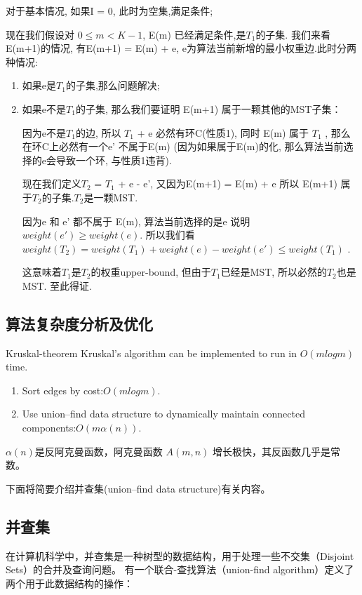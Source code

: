 对于基本情况, 如果I = 0, 此时为空集,满足条件;

现在我们假设对 $0 \leq m < K-1$, E(m) 已经满足条件,是$T_1$的子集. 我们来看 E(m+1)的情况,
有E(m+1) = E(m) + {e}, e为算法当前新增的最小权重边.此时分两种情况:

\begin{enumerate}
	\item 如果{e}是$T_1$的子集,那么问题解决;
	\item 如果{e}不是$T_1$的子集, 那么我们要证明 E(m+1) 属于一颗其他的MST子集：

	因为{e}不是$T_1$的边, 所以 $T_1$ + {e} 必然有环C(性质1), 同时 E(m) 属于 $T_1$ ,
	那么在环C上必然有一个{e'} 不属于E(m) (因为如果属于E(m)的化, 那么算法当前选择的{e}会导致一个环, 与性质1违背).
	
	现在我们定义$T_2$ = $T_1$ + {e} - {e'}, 又因为E(m+1) = E(m) + {e} 所以 E(m+1) 属于$T_2$的子集.$T_2$是一颗MST.
	
	因为{e} 和 {e'} 都不属于 E(m), 算法当前选择的是{e} 说明 $weight({e'}) \geq weight({e})$.
	所以我们看$weight(T_2) = weight(T_1) + weight({e}) - weight({e'}) \leq weight(T_1)$ .
	
	这意味着$T_1$是$T_2$的权重upper-bound, 但由于$T_1$已经是MST, 所以必然的$T_2$也是MST. 至此得证.	
\end{enumerate}

\subsection{算法复杂度分析及优化}
\begin{theorem}{}{Kruskal-theorem}
	Kruskal’s algorithm can be implemented to run in $O(m log m)$ time.
\end{theorem}

\begin{enumerate}
	\item Sort edges by cost:$O(m log m)$.
	\item Use union–find data structure to dynamically maintain connected components:$O(m \alpha (n))$.
\end{enumerate}

\begin{remark}
	$\alpha (n)$是反阿克曼函数，阿克曼函数 $A(m,n)$ 增长极快，其反函数几乎是常数。
\end{remark}

下面将简要介绍并查集(union–find data structure)有关内容。
\subsection{并查集}
在计算机科学中，并查集是一种树型的数据结构，用于处理一些不交集（Disjoint Sets）的合并及查询问题。
有一个联合-查找算法（union-find algorithm）定义了两个用于此数据结构的操作：

